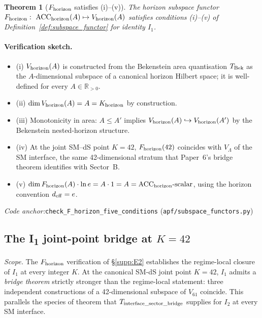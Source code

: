 \documentclass[11pt]{article}
\theoremstyle{plain}
\newtheorem{theorem}{Theorem}[section]
\theoremstyle{definition}
\theoremstyle{remark}
\newcommand{\coderef}[2]{\par\noindent\textit{Code anchor:}\quad\texttt{#1} (\texttt{#2})}
\begin{document}
\begin{theorem}[$F_{\rm horizon}$ satisfies (i)--(v)]\label{thm:F_horizon}
The horizon subspace functor $F_{\rm horizon} :\ \mathrm{ACC}_{\rm horizon}(A) \mapsto V_{\rm horizon}(A)$ satisfies conditions (i)--(v) of Definition~\ref{def:subspace_functor} for identity $I_1$.
\end{theorem}

\paragraph{Verification sketch.}
\begin{itemize}[leftmargin=2em,itemsep=2pt]
  \item (i) $V_{\rm horizon}(A)$ is constructed from the Bekenstein area quantisation $T_{\rm Bek}$ as the $A$-dimensional subspace of a canonical horizon Hilbert space; it is well-defined for every $A \in \mathbb{R}_{>0}$.
  \item (ii) $\dim V_{\rm horizon}(A) = A = K_{\rm horizon}$ by construction.
  \item (iii) Monotonicity in area: $A \leq A'$ implies $V_{\rm horizon}(A) \hookrightarrow V_{\rm horizon}(A')$ by the Bekenstein nested-horizon structure.
  \item (iv) At the joint SM--dS point $K = 42$, $F_{\rm horizon}(42)$ coincides with $V_\Lambda$ of the SM interface, the same 42-dimensional stratum that Paper~6's bridge theorem identifies with Sector~B.
  \item (v) $\dim F_{\rm horizon}(A) \cdot \ln e = A \cdot 1 = A = \mathrm{ACC}_{\rm horizon}\text{-scalar}$, using the horizon convention $d_{\rm eff} = e$.
\end{itemize}

\coderef{check\_F\_horizon\_five\_conditions}{apf/subspace\_functors.py}

\bigskip

\subsection{The I\textsubscript{1} joint-point bridge at $K = 42$}\label{supp:E2prime}

\noindent\textit{Scope.}  The $F_{\rm horizon}$ verification of \S\ref{supp:E2} establishes the regime-local closure of $I_1$ at every integer $K$.  At the canonical SM-dS joint point $K = 42$, $I_1$ admits a \emph{bridge theorem} strictly stronger than the regime-local statement: three independent constructions of a 42-dimensional subspace of $V_{61}$ coincide.  This parallels the species of theorem that $T_{\rm interface\_sector\_bridge}$ supplies for $I_2$ at every SM interface.
\end{document}
